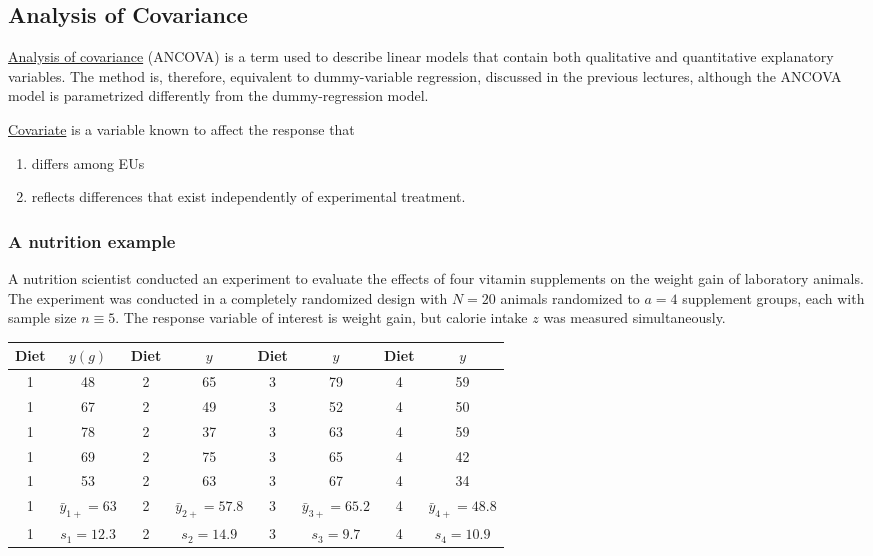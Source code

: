 \subsection*{Analysis of Covariance}
\underline{Analysis of covariance} (ANCOVA) is a term used to describe linear models that contain both qualitative and quantitative explanatory variables.
The method is, therefore, equivalent to dummy-variable regression, discussed in the previous lectures, although the ANCOVA model is parametrized differently from the dummy-regression model.

\underline{Covariate} is a variable known to affect the response that
\begin{enumerate}
	\item differs among EUs
	\item reflects differences that exist independently of experimental treatment.
\end{enumerate}

\subsubsection*{A nutrition example}
A nutrition scientist conducted an experiment to evaluate the effects of four vitamin supplements on the weight gain of laboratory animals.
The experiment was conducted in a completely randomized design with $N=20$ animals randomized to $a=4$ supplement groups, 
each with sample size $n \equiv 5$.
The response variable of interest is weight gain, but calorie intake $z$ was measured simultaneously.
\begin{table}[H]
	\renewcommand{\arraystretch}{1.5}
	\centering
	\begin{tabular}{|cc|cc|cc|cc|}
		\toprule
		Diet & $y(g)$ & Diet & $y$& Diet & $y$& Diet & $y$\\
		\hline
		1 & 48 & 2 & 65 & 3 & 79 & 4 &59 \\
		1 & 67 & 2 & 49 & 3 & 52 & 4 &50 \\
		1 & 78 & 2 & 37 & 3 & 63 & 4 &59 \\
		1 & 69 & 2 & 75 & 3 & 65 & 4 &42 \\
		1 & 53 & 2 & 63 & 3 & 67 & 4 &34 \\
		\hline
		1 & $\bar{y}_{1+} = 63$ & 2 & $\bar{y}_{2+} = 57.8$ & 3 & $\bar{y}_{3+} = 65.2$ & 4 &$\bar{y}_{4+} = 48.8$ \\
		1 & $s_1 = 12.3$ & 2 & $s_2 = 14.9$ & 3 & $s_3 = 9.7$ & 4 &$s_4 = 10.9$ \\
		\bottomrule
	\end{tabular}
\end{table}

